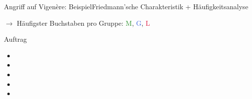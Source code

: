 \begin{frame}{Angriff auf Vigenère: Beispiel}{Friedmann'sche Charakteristik + Häufigkeitsanalyse}
\texttt{}
		
		$\rightarrow$ Häufigster Buchstaben pro Gruppe: \textcolor{ForestGreen}{M}, \textcolor{RoyalBlue}{G}, \textcolor{Crimson}{L}
		
		\begin{figure}[H]
			\centering
			\resizebox{.75\textwidth}{!}{\caesar[8] \caesar[2] \caesar[7]}
		\end{figure}
\end{frame}

\begin{frame}{Auftrag}
	\begin{itemize}
		\item {}
		\item {}
		\item {}
		\item {}
		\item {}
	\end{itemize}
\end{frame}